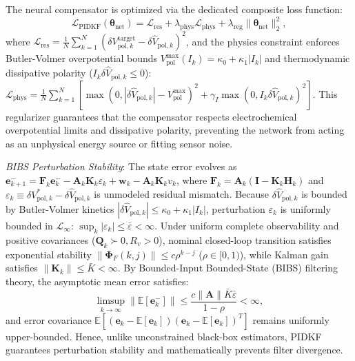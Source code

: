 \documentclass[balance,nocopyright,upint,varvw,hyphenate,barcolor=NavyBlue,nolists]{asmejour}
\begin{document}
The neural compensator is optimized via the dedicated composite loss function:
\begin{equation}\label{eqn:loss_pidkf}
\mathcal{L}_{\text{PIDKF}}(\boldsymbol{\theta}_{\text{net}}) = \mathcal{L}_{\text{res}} + \lambda_{\text{phys}} \mathcal{L}_{\text{phys}} + \lambda_{\text{reg}} \|\boldsymbol{\theta}_{\text{net}}\|_2^2,
\end{equation}
where $\mathcal{L}_{\text{res}} = \frac{1}{N}\sum_{k=1}^N (\delta V_{\text{pol},k}^{\text{target}} - \delta \hat{V}_{\text{pol},k})^2$, and the physics constraint enforces Butler-Volmer overpotential bounds $V_{\text{pol}}^{\max}(I_k) = \kappa_0 + \kappa_1 |I_k|$ and thermodynamic dissipative polarity ($I_k \delta \hat{V}_{\text{pol},k} \le 0$): $\mathcal{L}_{\text{phys}} = \frac{1}{N}\sum_{k=1}^N [ \max(0, |\delta \hat{V}_{\text{pol},k}| - V_{\text{pol}}^{\max})^2 + \gamma_I \max(0, I_k \delta \hat{V}_{\text{pol},k})^2 ]$. This regularizer guarantees that the compensator respects electrochemical overpotential limits and dissipative polarity, preventing the network from acting as an unphysical energy source or fitting sensor noise.

\emph{BIBS Perturbation Stability}: The state error evolves as $\mathbf{e}_{k+1}^- = \mathbf{F}_k \mathbf{e}_k^- - \mathbf{A}_k \mathbf{K}_k \varepsilon_k + \mathbf{w}_k - \mathbf{A}_k \mathbf{K}_k v_k$, where $\mathbf{F}_k = \mathbf{A}_k (\mathbf{I} - \mathbf{K}_k \mathbf{H}_k)$ and $\varepsilon_k \equiv \delta V_{\text{pol},k}^* - \delta \hat{V}_{\text{pol},k}$ is unmodeled residual mismatch. Because $\delta \hat{V}_{\text{pol},k}$ is bounded by Butler-Volmer kinetics $|\delta \hat{V}_{\text{pol},k}| \le \kappa_0 + \kappa_1 |I_k|$, perturbation $\varepsilon_k$ is uniformly bounded in $\mathcal{L}_\infty$: $\sup_k |\varepsilon_k| \le \bar{\varepsilon} < \infty$. Under uniform complete observability and positive covariances ($\mathbf{Q}_k \succ 0, R_v > 0$), nominal closed-loop transition satisfies exponential stability $\|\boldsymbol{\Phi}_F(k, j)\| \le c \rho^{k-j}$ ($\rho \in [0, 1)$), while Kalman gain satisfies $\|\mathbf{K}_k\| \le \bar{K} < \infty$. By Bounded-Input Bounded-State (BIBS) filtering theory, the asymptotic mean error satisfies:
\begin{equation}\label{eqn:bibs_pidkf}
\limsup_{k \to \infty} \|\mathbb{E}[\mathbf{e}_k^-]\| \le \frac{c \|\mathbf{A}\| \bar{K} \bar{\varepsilon}}{1 - \rho} < \infty,
\end{equation}
and error covariance $\mathbb{E}[(\mathbf{e}_k - \mathbb{E}[\mathbf{e}_k])(\mathbf{e}_k - \mathbb{E}[\mathbf{e}_k])^T]$ remains uniformly upper-bounded. Hence, unlike unconstrained black-box estimators, PIDKF guarantees perturbation stability and mathematically prevents filter divergence.
\end{document}
